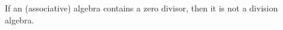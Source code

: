 \begin{theorem}\label{t:zero-divisor}
	If an (associative) algebra contains a zero divisor, then it is not a division algebra.
\end{theorem}
